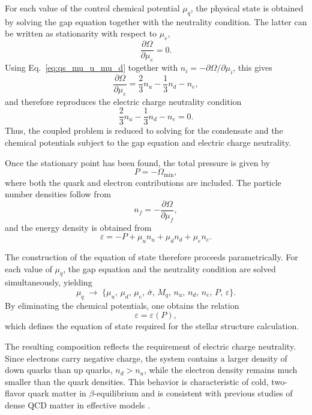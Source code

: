 For each value of the control chemical potential \(\mu_q\), the physical
state is obtained by solving the gap equation together with the
neutrality condition. The latter can be written as stationarity with
respect to \(\mu_e\),
\begin{equation}
\frac{\partial \Omega}{\partial \mu_e} = 0.
\end{equation}
Using Eq.~\eqref{eq:qs_mu_u_mu_d} together with
\(n_i = -\partial\Omega/\partial\mu_i\), this gives
\begin{equation}
\frac{\partial \Omega}{\partial \mu_e}
=
\frac{2}{3}n_u
-
\frac{1}{3}n_d
-
n_e,
\end{equation}
and therefore reproduces the electric charge neutrality condition
\begin{equation}
\frac{2}{3}n_u
-
\frac{1}{3}n_d
-
n_e
=
0.
\end{equation}
Thus, the coupled problem is reduced to solving for the condensate and
the chemical potentials subject to the gap equation and electric charge
neutrality.

Once the stationary point has been found, the total pressure is given
by
\begin{equation}
P = -\Omega_{\min},
\end{equation}
where both the quark and electron contributions are included. The
particle number densities follow from
\begin{equation}
n_f = -\frac{\partial \Omega}{\partial \mu_f},
\end{equation}
and the energy density is obtained from
\begin{equation}
\varepsilon
=
-P
+
\mu_u n_u
+
\mu_d n_d
+
\mu_e n_e .
\end{equation}

The construction of the equation of state therefore proceeds
parametrically. For each value of $\mu_q$, the gap equation and the
neutrality condition are solved simultaneously, yielding
\begin{equation}
\mu_q
\;\longrightarrow\;
\{\mu_u,\,\mu_d,\,\mu_e,\,\bar{\sigma},\, M_q,\,
n_u,\, n_d,\, n_e,\, P,\, \varepsilon\}.
\end{equation}
By eliminating the chemical potentials, one obtains the relation
\begin{equation}
\varepsilon = \varepsilon(P),
\end{equation}
which defines the equation of state required for the stellar structure
calculation.

The resulting composition reflects the requirement of electric charge
neutrality. Since electrons carry negative charge, the system contains
a larger density of down quarks than up quarks, \(n_d > n_u\), while
the electron density remains much smaller than the quark densities.
This behavior is characteristic of cold, two-flavor quark matter in
\(\beta\)-equilibrium and is consistent with previous studies of dense
QCD matter in effective models
\cite{Buballa2005,Schmitt2010,Alford2008}.

